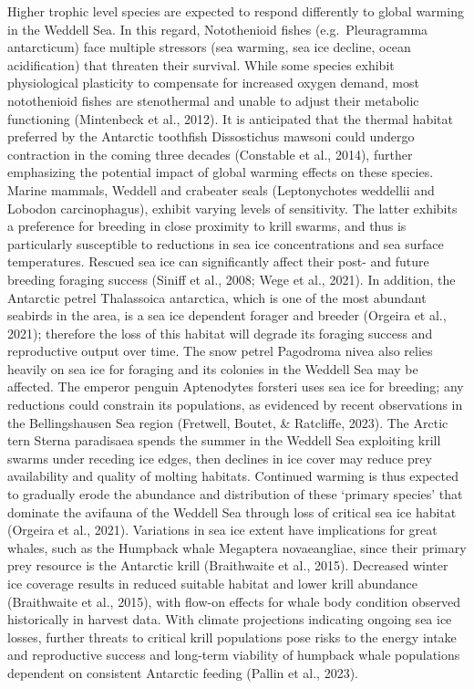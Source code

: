\documentclass[
]{article}
\begin{document}
Higher trophic level species are expected to respond differently to
global warming in the Weddell Sea. In this regard, Notothenioid fishes
(e.g.~Pleuragramma antarcticum) face multiple stressors (sea warming,
sea ice decline, ocean acidification) that threaten their survival.
While some species exhibit physiological plasticity to compensate for
increased oxygen demand, most notothenioid fishes are stenothermal and
unable to adjust their metabolic functioning (Mintenbeck et al., 2012).
It is anticipated that the thermal habitat preferred by the Antarctic
toothfish Dissostichus mawsoni could undergo contraction in the coming
three decades (Constable et al., 2014), further emphasizing the
potential impact of global warming effects on these species. Marine
mammals, Weddell and crabeater seals (Leptonychotes weddellii and
Lobodon carcinophagus), exhibit varying levels of sensitivity. The
latter exhibits a preference for breeding in close proximity to krill
swarms, and thus is particularly susceptible to reductions in sea ice
concentrations and sea surface temperatures. Rescued sea ice can
significantly affect their post- and future breeding foraging success
(Siniff et al., 2008; Wege et al., 2021). In addition, the Antarctic
petrel Thalassoica antarctica, which is one of the most abundant
seabirds in the area, is a sea ice dependent forager and breeder
(Orgeira et al., 2021); therefore the loss of this habitat will degrade
its foraging success and reproductive output over time. The snow petrel
Pagodroma nivea also relies heavily on sea ice for foraging and its
colonies in the Weddell Sea may be affected. The emperor penguin
Aptenodytes forsteri uses sea ice for breeding; any reductions could
constrain its populations, as evidenced by recent observations in the
Bellingshausen Sea region (Fretwell, Boutet, \& Ratcliffe, 2023). The
Arctic tern Sterna paradisaea spends the summer in the Weddell Sea
exploiting krill swarms under receding ice edges, then declines in ice
cover may reduce prey availability and quality of molting habitats.
Continued warming is thus expected to gradually erode the abundance and
distribution of these `primary species' that dominate the avifauna of
the Weddell Sea through loss of critical sea ice habitat (Orgeira et
al., 2021). Variations in sea ice extent have implications for great
whales, such as the Humpback whale Megaptera novaeangliae, since their
primary prey resource is the Antarctic krill (Braithwaite et al., 2015).
Decreased winter ice coverage results in reduced suitable habitat and
lower krill abundance (Braithwaite et al., 2015), with flow-on effects
for whale body condition observed historically in harvest data. With
climate projections indicating ongoing sea ice losses, further threats
to critical krill populations pose risks to the energy intake and
reproductive success and long-term viability of humpback whale
populations dependent on consistent Antarctic feeding (Pallin et al.,
2023).
\end{document}
